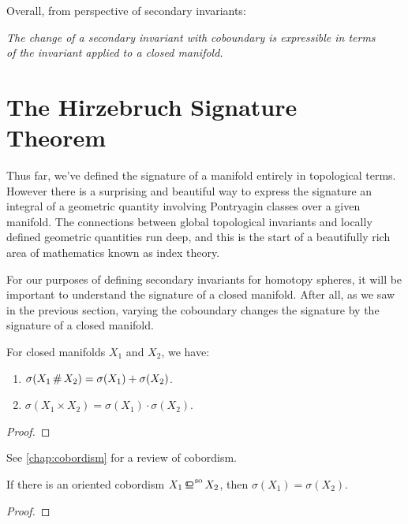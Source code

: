 Overall, from perspective of secondary invariants:
\begin{center}
	\textsl{The change of a secondary invariant with coboundary is expressible in terms}\\
	\textsl{of the invariant applied to a closed manifold.}
\end{center}


\section{The Hirzebruch Signature Theorem}

Thus far, we've defined the signature of a manifold entirely in topological terms.
However there is a surprising and beautiful way to express the signature an integral of a geometric quantity involving Pontryagin classes over a given manifold.
The connections between global topological invariants and locally defined geometric quantities run deep, and this is the start of a beautifully rich area of mathematics known as index theory.

For our purposes of defining secondary invariants for homotopy spheres, it will be important to understand the signature of a closed manifold. After all, as we saw in the previous section, varying the coboundary changes the signature by the signature of a closed manifold.

\begin{proposition}
	For closed manifolds $X_1$ and $X_2$, we have:
	\begin{enumerate}
		\item $\sigma(X_1\,\#\, X_2) = \sigma(X_1)+\sigma(X_2)$.
		\item $\sigma(X_1\times X_2) = \sigma(X_1)\cdot\sigma(X_2)$.
	\end{enumerate}
\end{proposition}
\begin{proof}
\end{proof}

See \cref{chap:cobordism} for a review of cobordism.

\begin{proposition}
	If there is an oriented cobordism $X_1 \sobord X_2$, then $\sigma(X_1)=\sigma(X_2)$.
\end{proposition}
\begin{proof}
\end{proof}

